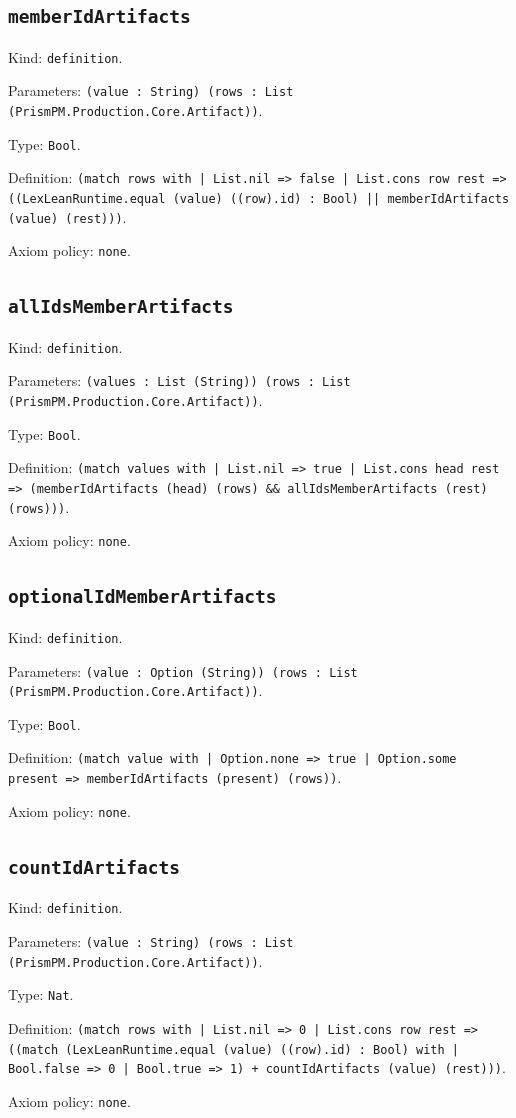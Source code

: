 \documentclass[11pt]{article}
\begin{document}
\subsection*{\texttt{memberIdArtifacts}}
\noindent Kind: \texttt{definition}.\par
\noindent Parameters: \texttt{(value : String) (rows : List (PrismPM.Production.Core.Artifact))}.\par
\noindent Type: \texttt{Bool}.\par
\noindent Definition: \texttt{(match rows with | List.nil => false | List.cons row rest => ((LexLeanRuntime.equal (value) ((row).id) : Bool) || memberIdArtifacts (value) (rest)))}.\par
\noindent Axiom policy: \texttt{none}.\par
\subsection*{\texttt{allIdsMemberArtifacts}}
\noindent Kind: \texttt{definition}.\par
\noindent Parameters: \texttt{(values : List (String)) (rows : List (PrismPM.Production.Core.Artifact))}.\par
\noindent Type: \texttt{Bool}.\par
\noindent Definition: \texttt{(match values with | List.nil => true | List.cons head rest => (memberIdArtifacts (head) (rows) \&\& allIdsMemberArtifacts (rest) (rows)))}.\par
\noindent Axiom policy: \texttt{none}.\par
\subsection*{\texttt{optionalIdMemberArtifacts}}
\noindent Kind: \texttt{definition}.\par
\noindent Parameters: \texttt{(value : Option (String)) (rows : List (PrismPM.Production.Core.Artifact))}.\par
\noindent Type: \texttt{Bool}.\par
\noindent Definition: \texttt{(match value with | Option.none => true | Option.some present => memberIdArtifacts (present) (rows))}.\par
\noindent Axiom policy: \texttt{none}.\par
\subsection*{\texttt{countIdArtifacts}}
\noindent Kind: \texttt{definition}.\par
\noindent Parameters: \texttt{(value : String) (rows : List (PrismPM.Production.Core.Artifact))}.\par
\noindent Type: \texttt{Nat}.\par
\noindent Definition: \texttt{(match rows with | List.nil => 0 | List.cons row rest => ((match (LexLeanRuntime.equal (value) ((row).id) : Bool) with | Bool.false => 0 | Bool.true => 1) + countIdArtifacts (value) (rest)))}.\par
\noindent Axiom policy: \texttt{none}.\par
\end{document}
